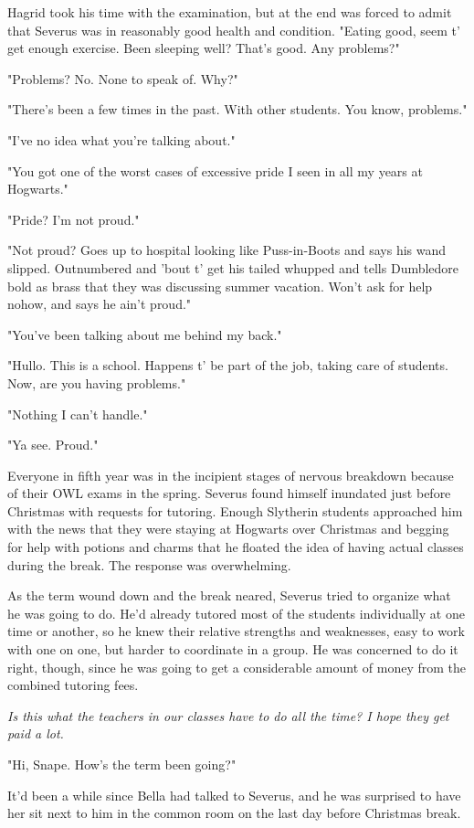 Hagrid took his time with the examination, but at the end was forced to admit that Severus was in reasonably good health and condition. "Eating good, seem t' get enough exercise. Been sleeping well? That's good. Any problems?"

"Problems? No. None to speak of. Why?"

"There's been a few times in the past. With other students. You know, problems."

"I've no idea what you're talking about."

"You got one of the worst cases of excessive pride I seen in all my years at Hogwarts."

"Pride? I'm not proud."

"Not proud? Goes up to hospital looking like Puss-in-Boots and says his wand slipped. Outnumbered and 'bout t' get his tailed whupped and tells Dumbledore bold as brass that they was discussing summer vacation. Won't ask for help nohow, and says he ain't proud."

"You've been talking about me behind my back."

"Hullo. This is a school. Happens t' be part of the job, taking care of students. Now, are you having problems."

"Nothing I can't handle."

"Ya see. Proud."

Everyone in fifth year was in the incipient stages of nervous breakdown because of their OWL exams in the spring. Severus found himself inundated just before Christmas with requests for tutoring. Enough Slytherin students approached him with the news that they were staying at Hogwarts over Christmas and begging for help with potions and charms that he floated the idea of having actual classes during the break. The response was overwhelming.

As the term wound down and the break neared, Severus tried to organize what he was going to do. He'd already tutored most of the students individually at one time or another, so he knew their relative strengths and weaknesses, easy to work with one on one, but harder to coordinate in a group. He was concerned to do it right, though, since he was going to get a considerable amount of money from the combined tutoring fees.

\emph{Is this what the teachers in our classes have to do all the time? I hope they get paid a lot.}

"Hi, Snape. How's the term been going?"

It'd been a while since Bella had talked to Severus, and he was surprised to have her sit next to him in the common room on the last day before Christmas break.

